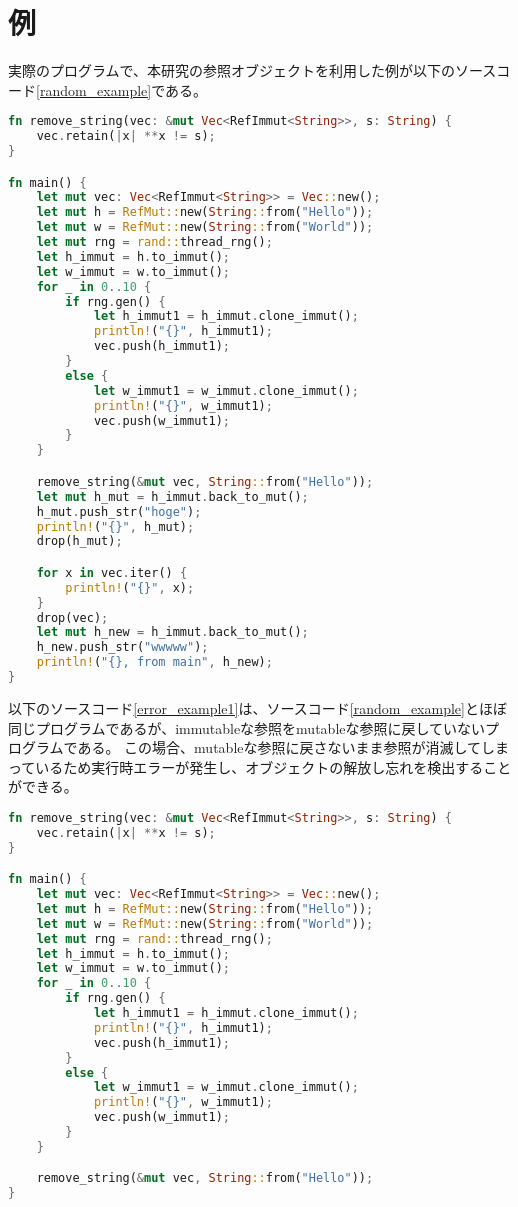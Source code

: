 \documentclass{sumiilab-paper}
\theoremstyle{mystyle}
\numberwithin{definition}{chapter} %
\begin{document}
\section{例}
実際のプログラムで、本研究の参照オブジェクトを利用した例が以下のソースコード\ref{random_example}である。
\begin{lstlisting}[language=Rust, caption=新たな参照オブジェクトを用いた柔軟なメモリ管理の例, label=random_example, captionpos=b]
fn remove_string(vec: &mut Vec<RefImmut<String>>, s: String) {
    vec.retain(|x| **x != s);
}

fn main() {
    let mut vec: Vec<RefImmut<String>> = Vec::new();
    let mut h = RefMut::new(String::from("Hello"));
    let mut w = RefMut::new(String::from("World"));
    let mut rng = rand::thread_rng();
    let h_immut = h.to_immut();
    let w_immut = w.to_immut();
    for _ in 0..10 {
        if rng.gen() {
            let h_immut1 = h_immut.clone_immut();
            println!("{}", h_immut1);
            vec.push(h_immut1);
        }
        else {
            let w_immut1 = w_immut.clone_immut();
            println!("{}", w_immut1);
            vec.push(w_immut1);
        }
    }

    remove_string(&mut vec, String::from("Hello"));
    let mut h_mut = h_immut.back_to_mut();
    h_mut.push_str("hoge");
    println!("{}", h_mut);
    drop(h_mut);

    for x in vec.iter() {
        println!("{}", x);
    }
    drop(vec);
    let mut h_new = h_immut.back_to_mut();
    h_new.push_str("wwwww");
    println!("{}, from main", h_new);
}
\end{lstlisting}

以下のソースコード\ref{error_example1}は、ソースコード\ref{random_example}とほぼ同じプログラムであるが、immutableな参照をmutableな参照に戻していないプログラムである。
この場合、mutableな参照に戻さないまま参照が消滅してしまっているため実行時エラーが発生し、オブジェクトの解放し忘れを検出することができる。
\begin{lstlisting}[language=Rust, caption=オブジェクトの解放し忘れを検出する例, label=error_example1, captionpos=b]
fn remove_string(vec: &mut Vec<RefImmut<String>>, s: String) {
    vec.retain(|x| **x != s);
}

fn main() {
    let mut vec: Vec<RefImmut<String>> = Vec::new();
    let mut h = RefMut::new(String::from("Hello"));
    let mut w = RefMut::new(String::from("World"));
    let mut rng = rand::thread_rng();
    let h_immut = h.to_immut();
    let w_immut = w.to_immut();
    for _ in 0..10 {
        if rng.gen() {
            let h_immut1 = h_immut.clone_immut();
            println!("{}", h_immut1);
            vec.push(h_immut1);
        }
        else {
            let w_immut1 = w_immut.clone_immut();
            println!("{}", w_immut1);
            vec.push(w_immut1);
        }
    }

    remove_string(&mut vec, String::from("Hello"));
}
\end{lstlisting}
\end{document}
